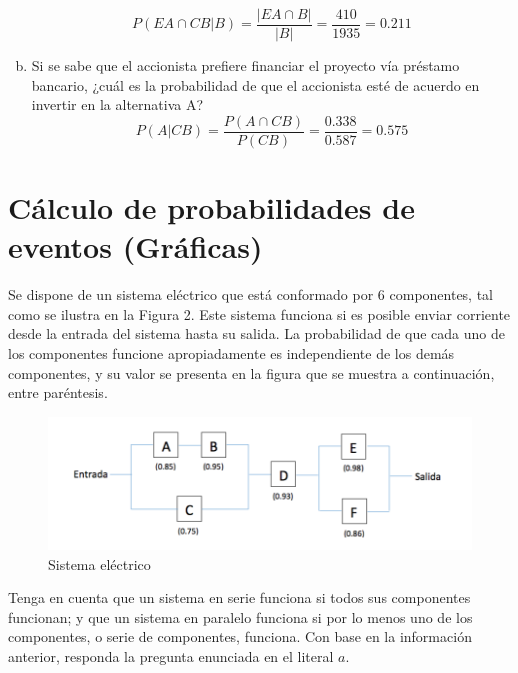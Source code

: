\documentclass[11pt, spanish]{article}
\begin{document}
\begin{enumerate}[(a)]
$$P(EA \cap CB | B) = \frac{\left| EA \cap B \right|}{\left| B \right|} =  \frac{410}{1935} =  0.211$$

\item Si se sabe que el accionista prefiere financiar el proyecto vía préstamo bancario, ¿cuál es la probabilidad de que el accionista esté de acuerdo en invertir en la alternativa A?\\

$$P(A | CB) = \frac{P(A \cap CB)}{P(CB)} =  \frac{0.338}{0.587} =  0.575$$
\end{enumerate}

\section{Cálculo de probabilidades de eventos (Gráficas)}

Se dispone de un sistema eléctrico que está conformado por 6 componentes, tal como se ilustra en la Figura 2. Este sistema funciona si es posible enviar corriente desde la entrada del sistema hasta su salida. La probabilidad de que cada uno de los componentes funcione apropiadamente es independiente de los demás componentes, y su valor se presenta en la figura que se muestra a continuación, entre paréntesis.

\begin{figure}[h]
\centering
	\includegraphics[scale=0.8]{circuit.png}
	\caption{Sistema eléctrico}
\end{figure}

Tenga en cuenta que un sistema en serie funciona si todos sus componentes funcionan; y que un sistema en paralelo funciona si por lo menos uno de los componentes, o serie de componentes, funciona. Con base en la información anterior, responda la pregunta enunciada en el literal $a$.
\end{document}
